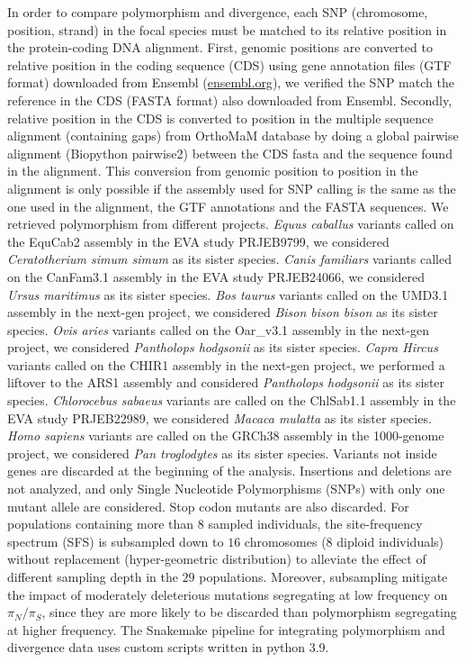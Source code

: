 \documentclass{article}
\newcommand{\pn}{\pi_N}
\newcommand{\ps}{\pi_S}
\newcommand{\pnps}{\pn / \ps}
\begin{document}
    In order to compare polymorphism and divergence, each SNP (chromosome, position, strand) in the focal species must be matched to its relative position in the protein-coding DNA alignment.
    First, genomic positions are converted to relative position in the coding sequence (CDS) using gene annotation files (GTF format) downloaded from Ensembl (\url{ensembl.org}), we verified the SNP match the reference in the CDS (FASTA format) also downloaded from Ensembl.
    Secondly, relative position in the CDS is converted to position in the multiple sequence alignment (containing gaps) from OrthoMaM database\cite{ranwez_orthomam_2007, douzery_orthomam_2014, scornavacca_orthomam_2019} by doing a global pairwise alignment (Biopython pairwise2) between the CDS fasta and the sequence found in the alignment.
    This conversion from genomic position to position in the alignment is only possible if the assembly used for SNP calling is the same as the one used in the alignment, the GTF annotations and the FASTA sequences.
    We retrieved polymorphism from different projects.
    \textit{Equus caballus} variants called on the EquCab2 assembly in the EVA study PRJEB9799, we considered \textit{Ceratotherium simum simum} as its sister species.
    \textit{Canis familiars} variants called on the CanFam3.1 assembly in the EVA study PRJEB24066, we considered \textit{Ursus maritimus} as its sister species.
    \textit{Bos taurus} variants called on the UMD3.1 assembly in the next-gen project, we considered \textit{Bison bison bison} as its sister species.
    \textit{Ovis aries} variants called on the Oar\_v3.1 assembly in the next-gen project, we considered \textit{Pantholops hodgsonii} as its sister species.
    \textit{Capra Hircus} variants called on the CHIR1 assembly in the next-gen project, we performed a liftover to the ARS1 assembly and considered \textit{Pantholops hodgsonii} as its sister species.
    \textit{Chlorocebus sabaeus} variants are called on the ChlSab1.1 assembly in the EVA study PRJEB22989\cite{svardal_ancient_2017}, we considered \textit{Macaca mulatta} as its sister species.
    \textit{Homo sapiens} variants are called on the GRCh38 assembly in the 1000-genome project\cite{consortium_integrated_2012, the1000genomesprojectconsortium_global_2015}, we considered \textit{Pan troglodytes} as its sister species.
    Variants not inside genes are discarded at the beginning of the analysis.
    Insertions and deletions are not analyzed, and only Single Nucleotide Polymorphisms (SNPs) with only one mutant allele are considered.
    Stop codon mutants are also discarded.
    For populations containing more than $8$ sampled individuals, the site-frequency spectrum (SFS) is subsampled down to $16$ chromosomes ($8$ diploid individuals) without replacement (hyper-geometric distribution) to alleviate the effect of different sampling depth in the $29$ populations.
    Moreover, subsampling mitigate the impact of moderately deleterious mutations segregating at low frequency on $\pnps$, since they are more likely to be discarded than polymorphism segregating at higher frequency.
    The Snakemake pipeline for integrating polymorphism and divergence data uses custom scripts written in python 3.9.
\end{document}
